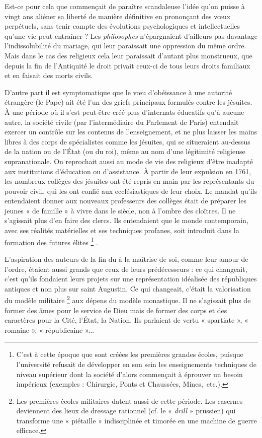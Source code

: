  Est-ce pour cela que commençait de paraître scandaleuse
l'idée qu'on puisse à vingt ans aliéner sa liberté de manière définitive en prononçant des vœux perpétuels, sans tenir compte des évolutions psychologiques et intellectuelles qu'une vie peut entraîner ? Les \emph{philosophes} n'épargnaient d'ailleurs pas davantage l'indissolubilité du mariage, qui leur paraissait une oppression du même ordre. Mais dans le cas des religieux cela leur paraissait d'autant plus monstrueux, que depuis la fin de l'Antiquité le droit privait ceux-ci de tous leurs droits familiaux et en faisait des morts civils. 

 D'autre part il est symptomatique que le vœu d'obéissance à une autorité étrangère (le Pape) ait été l'un des griefs principaux formulés contre les jésuites. À une période où il s'est peut-être créé plus d'internats éducatifs qu'à aucune autre, la société civile (par l'intermédiaire du Parlement de Paris) entendait exercer un contrôle sur les contenus de l'enseignement, et ne plus laisser les mains libres à des corps de spécialistes comme les jésuites, qui se situeraient au-dessus de la nation ou de l'État (ou du roi), même au nom d'une légitimité religieuse supranationale. On reprochait aussi au mode de vie des religieux d'être inadapté aux institutions d'éducation ou d'assistance. À partir de leur expulsion en 1761, les nombreux collèges des jésuites ont été repris en main par les représentants du pouvoir civil, qui les ont confié aux ecclésiastiques de leur choix. Le mandat qu'ils entendaient donner aux nouveaux professeurs des collèges était de préparer les jeunes « de famille » à vivre dans le siècle, non à l'ombre des cloîtres. Il ne s'agissait plus d'en faire des clercs. Ils entendaient que le monde contemporain, avec ses réalités matérielles et ses techniques profanes, soit introduit dans la formation des futures élites%
\footnote{C'est à cette époque que sont créées les premières grandes écoles, puisque l'université refusait de développer en son sein les enseignements techniques de niveau supérieur dont la société d'alors commençait à éprouver un besoin impérieux (exemples : Chirurgie, Ponts et Chaussées, Mines,~etc.).}%
.

 L'aspiration des auteurs de la fin du  à la maîtrise de soi, comme leur amour de l'ordre, étaient aussi grands que ceux de leurs prédécesseurs : ce qui changeait, c'est qu'ils fondaient leurs projets sur une représentation idéalisée des républiques antiques et non plus sur saint Augustin. Ce qui changeait, c'était la valorisation du modèle militaire%
\footnote{Les premières écoles militaires datent aussi de cette période. Les casernes deviennent des lieux de dressage rationnel (cf. le « \emph{drill} » prussien) qui transforme une « piétaille » indisciplinée et timorée en une machine de guerre efficace.} 
aux dépens du modèle monastique. Il ne s'agissait plus de former des âmes pour le service de Dieu mais de former des corps et des caractères pour la Cité, l'État, la Nation. Ils parlaient de vertu « spartiate », « romaine », « républicaine »...

